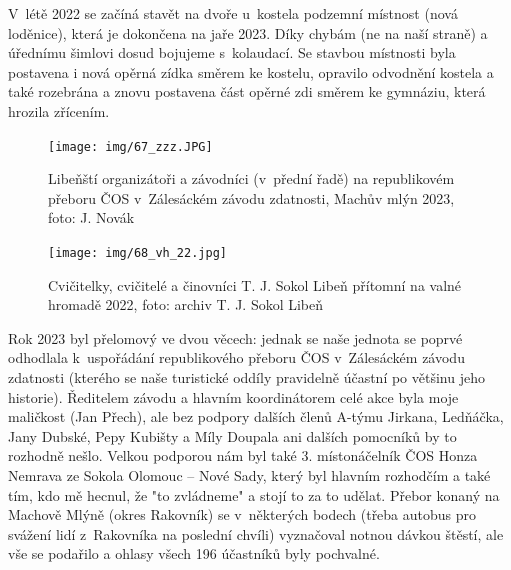 \documentclass[a5paper, 11pt, twoside]{article}
\begin{document}
V~létě 2022 se začíná stavět na dvoře u~kostela podzemní místnost (nová
loděnice), která je dokončena na jaře 2023. Díky chybám (ne na naší
straně) a úřednímu šimlovi dosud bojujeme s~kolaudací. Se stavbou
místnosti byla postavena i nová opěrná zídka směrem ke kostelu, opravilo
odvodnění kostela a také rozebrána a znovu postavena část opěrné zdi
směrem ke gymnáziu, která hrozila zřícením.

\begin{figure}[hp]
  \centering 
  \texttt{[image: img/67\_zzz.JPG]}
  \caption*{Libeňští organizátoři a závodníci (v~přední řadě) na republikovém
  přeboru ČOS v~Zálesáckém závodu zdatnosti, Machův mlýn 2023, foto: J.
  Novák}
\end{figure}

\begin{figure}[hp]
  \centering 
  \texttt{[image: img/68\_vh\_22.jpg]}
  \caption*{Cvičitelky, cvičitelé a činovníci T. J. Sokol Libeň přítomní na
  valné hromadě 2022, foto: archiv T. J. Sokol Libeň}
\end{figure}


Rok 2023 byl přelomový ve dvou věcech: jednak se naše jednota se poprvé
odhodlala k~uspořádání republikového přeboru ČOS v~Zálesáckém závodu
zdatnosti (kterého se naše turistické oddíly pravidelně účastní po
většinu jeho historie). Ředitelem závodu a hlavním koordinátorem celé
akce byla moje maličkost (Jan Přech), ale bez podpory dalších členů
A-týmu Jirkana, Ledňáčka, Jany Dubské, Pepy Kubišty a Míly Doupala ani
dalších pomocníků by to rozhodně nešlo. Velkou podporou nám byl také 3.
místonáčelník ČOS Honza Nemrava ze Sokola Olomouc -- Nové Sady, který
byl hlavním rozhodčím a také tím, kdo mě hecnul, že "to zvládneme" a
stojí to za to udělat. Přebor konaný na Machově Mlýně (okres Rakovník)
se v~některých bodech (třeba autobus pro svážení lidí z~Rakovníka na
poslední chvíli) vyznačoval notnou dávkou štěstí, ale vše se podařilo a
ohlasy všech 196 účastníků byly pochvalné.
\end{document}
